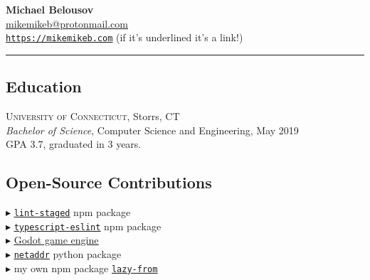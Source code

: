 \documentclass[Letterpaper,11pt]{article}
\newcommand\bul{$\blacktriangleright$ }
\newcommand\link[2]{\href{#1}{\underline{#2}}}
\begin{document}
\setlength{\parindent}{0em}
\setlength{\parskip}{1em}
\setlength{\parsep}{1em}
\setlength{\itemsep}{0.2em}
\setlength{\headsep}{0.2em}
\setlength{\topskip}{0.2em}
\setlength{\topmargin}{0.2em}
\setlength{\topsep}{0.2em}
\setlength{\partopsep}{0.2em}
\setlength{\columnsep}{1em}

\addtolength{\topmargin}{-4em}

\textbf{\Large Michael Belousov}\\
\link{mailto:mikemikeb@protonmail.com}{mikemikeb@protonmail.com}\\
\link{https://mikemikeb.com}{\texttt{https://mikemikeb.com}} (if it's underlined it's a link!)
\vspace{0.5em} %
\hrule
\vspace{0.5em} %

\begin{multicols}{2}

    \section*{Education}

        \textsc{University of Connecticut}, Storrs, CT\\
        \textit{Bachelor of Science}, Computer Science and Engineering, May 2019\\
        GPA 3.7, graduated in 3 years.

    \subsection*{Open-Source Contributions}
        \bul \link{https://github.com/okonet/lint-staged}{\texttt{lint-staged}} npm package
        \\
        \bul \link{https://github.com/typescript-eslint/typescript-eslint}{\texttt{typescript-eslint}} npm package
        \\
        \bul \link{https://github.com/godotengine/godot}{Godot game engine}
        \\
        \bul \link{https://github.com/netaddr/netaddr}{\texttt{netaddr}} python package
        \\
        \bul my own npm package \link{https://www.npmjs.com/package/lazy-from}{\texttt{lazy-from}}


\end{multicols}
\end{document}
